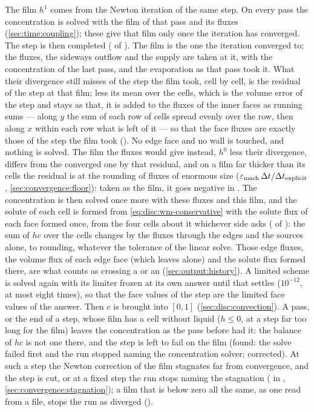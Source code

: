 The film $h^{1}$ comes from the Newton iteration of the same step. On every
pass the concentration is solved with the film of that pass and its fluxes
(\cref{sec:time:coupling}); these give that film only once the iteration has
converged. The step is then completed ( of
). The film is the one the iteration converged
to; the fluxes, the sideways outflow and the supply are taken at it, with the
concentration of the last pass, and the evaporation as that pass took it.
What their divergence still misses of the step the film took, cell by cell,
is the residual of the step at that film; less its mean over the cells, which
is the volume error of the step and stays as that, it is added to the fluxes
of the inner faces as running sums --- along $y$ the sum of each row of cells
spread evenly over the row, then along $x$ within each row what is left of
it --- so that the face fluxes are exactly those of the step the film took
(). No edge face and no wall is touched, and nothing
is solved. The film the fluxes would give instead, $h^{0}$ less their
divergence, differs from the converged one by that residual, and on a film far
thicker than its cells the residual is at the rounding of fluxes of enormous
size ($\varepsilon_{\mathrm{mach}}\,\Delta t/\Delta t_{\mathrm{explicit}}$,
\cref{sec:convergence:floor}): taken as the film, it goes negative in
. The concentration is then
solved once more with these fluxes and this film, and the solute of each cell
is formed from \cref{eq:disc:wm-conservative} with the solute flux of each
face formed once, from the four cells about it whichever side asks
( of ): the sum of $hc$ over the
cells changes by the fluxes through the edges and the sources alone, to
rounding, whatever the tolerance of the linear solve. Those edge fluxes, the
volume flux of each edge face (which  leaves alone)
and the solute flux  formed there, are what
 counts as crossing a  or an
 (\cref{sec:output:history}). A limited scheme is
solved again with its limiter frozen at its own answer until that settles
($10^{-12}$, at most eight times), so that the face values of the step are
the limited face values of the answer. Then $c$ is brought into $[0, 1]$
(\cref{sec:disc:convection}). A pass, or the end of a step, whose film has a
cell without liquid ($h \le 0$, at a step far too long for the film) leaves
the concentration as the pass before had it: the balance of $hc$ is not one
there, and the step is left to fail on the film (found: the
solve failed first and the run stopped naming the concentration solver;
corrected). At such a step the Newton correction of the film stagnates far
from convergence, and the step is cut, or at a fixed step the run stops
naming the stagnation ( in ,
\cref{sec:convergence:stagnation}); a film that is below zero all the same,
as one read from a file, stops the run as diverged ().

